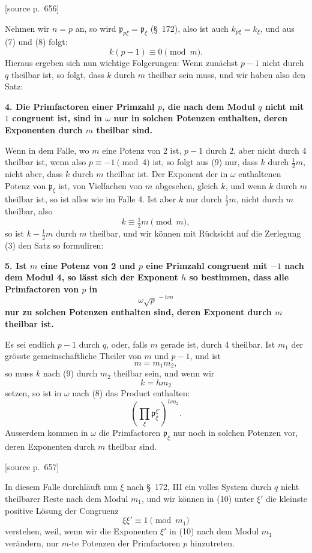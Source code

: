 \documentclass[11pt]{article}
\newcommand{\pp}{\mathfrak p}
\newcommand{\srcpage}[1]{\par\medskip\noindent\textsf{[source p.~#1]}\par\smallskip}
\begin{document}
\srcpage{656}
Nehmen wir $n=p$ an, so wird $\pp_{p\xi}=\pp_\xi$ (\S~172), also ist auch $k_{p\xi}=k_\xi$, und aus (7) und (8) folgt:
\begin{equation}
  k(p-1)\equiv0\pmod m.
\tag{9}
\end{equation}
Hieraus ergeben sich nun wichtige Folgerungen: Wenn zunächst $p-1$ nicht durch $q$ theilbar ist, so folgt, dass $k$ durch $m$ theilbar sein muss, und wir haben also den Satz:

\textbf{4. Die Primfactoren einer Primzahl $p$, die nach dem Modul $q$ nicht mit $1$ congruent ist, sind in $\omega$ nur in solchen Potenzen enthalten, deren Exponenten durch $m$ theilbar sind.}

Wenn in dem Falle, wo $m$ eine Potenz von 2 ist, $p-1$ durch 2, aber nicht durch 4 theilbar ist, wenn also $p\equiv-1\pmod4$ ist, so folgt aus (9) nur, dass $k$ durch $\tfrac12m$, nicht aber, dass $k$ durch $m$ theilbar ist. Der Exponent der in $\omega$ enthaltenen Potenz von $\pp_\xi$ ist, von Vielfachen von $m$ abgesehen, gleich $k$, und wenn $k$ durch $m$ theilbar ist, so ist alles wie im Falle 4. Ist aber $k$ nur durch $\tfrac12m$, nicht durch $m$ theilbar, also
\[
  k\equiv\tfrac12m\pmod m,
\]
so ist $k-\tfrac12m$ durch $m$ theilbar, und wir können mit Rücksicht auf die Zerlegung (3) den Satz so formuliren:

\textbf{5. Ist $m$ eine Potenz von 2 und $p$ eine Primzahl congruent mit $-1$ nach dem Modul 4, so lässt sich der Exponent $h$ so bestimmen, dass alle Primfactoren von $p$ in}
\[
  \omega\sqrt p^{\,-hm}
\]
\textbf{nur zu solchen Potenzen enthalten sind, deren Exponent durch $m$ theilbar ist.}

Es sei endlich $p-1$ durch $q$, oder, falls $m$ gerade ist, durch 4 theilbar. Ist $m_1$ der grösste gemeinschaftliche Theiler von $m$ und $p-1$, und ist
\[
  m=m_1m_2,
\]
so muss $k$ nach (9) durch $m_2$ theilbar sein, und wenn wir
\[
  k=hm_2
\]
setzen, so ist in $\omega$ nach (8) das Product enthalten:
\begin{equation}
  \left(\prod_\xi\pp_\xi^{\xi'}\right)^{hm_2}.
\tag{10}
\end{equation}
Ausserdem kommen in $\omega$ die Primfactoren $\pp_\xi$ nur noch in solchen Potenzen vor, deren Exponenten durch $m$ theilbar sind.

\srcpage{657}
In diesem Falle durchläuft nun $\xi$ nach \S~172, III ein volles System durch $q$ nicht theilbarer Reste nach dem Modul $m_1$, und wir können in (10) unter $\xi'$ die kleinste positive Lösung der Congruenz
\[
  \xi\xi'\equiv1\pmod{m_1}
\]
verstehen, weil, wenn wir die Exponenten $\xi'$ in (10) nach dem Modul $m_1$ verändern, nur $m$-te Potenzen der Primfactoren $p$ hinzutreten.
\end{document}
